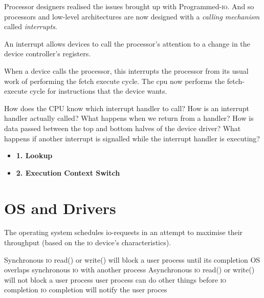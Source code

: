 Processor designers realised the issues brought up with Programmed-\textsc{io}.
And so processors and low-level architectures are now designed with a
\textit{calling mechanism} called \textit{interrupts}.



An interrupt allows devices to call the processor’s attention to a 
change in the device controller’s registers.

When a device calls the processor, this interrupts the processor 
from its usual work of performing the fetch execute cycle. 
The cpu now performs the fetch-execute cycle for instructions that the device wants. 

How does the CPU know which interrupt handler to call?
How is an interrupt handler actually called?
What happens when we return from a handler?
How is data passed between the top and bottom halves of the device driver?
What happens if another interrupt is signalled while the interrupt handler is executing?

\begin{itemize}   
\renewcommand{\labelitemi}{$\Box$}
\item \textbf{1. Lookup} 
\item \textbf{2. Execution Context Switch}
\end{itemize}




\section{OS and Drivers}





The operating system schedules io-requests in an attempt to maximise their throughput (based on the \textsc{io} device’s characteristics).






Synchronous \textsc{io} read() or write() will block a user process until its completion 
OS overlaps synchronous \textsc{io} with another process 
Asynchronous \textsc{io} read() or write() will not block a user process 
user process can do other things before \textsc{io} completion 
\textsc{io} completion will notify the user proces
